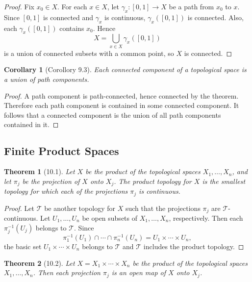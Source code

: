 \documentclass[12pt]{article}
\newtheorem{theorem}{Theorem}
\newtheorem{corollary}{Corollary}
\begin{document}
\begin{proof}
Fix $x_0 \in X$. For each $x \in X$, let $\gamma_x:[0,1]\to X$ be a path from $x_0$ to $x$. Since $[0,1]$ is connected and $\gamma_x$ is continuous, $\gamma_x([0,1])$ is connected. Also, each $\gamma_x([0,1])$ contains $x_0$. Hence
\[
X=\bigcup_{x\in X}\gamma_x([0,1])
\]
is a union of connected subsets with a common point, so $X$ is connected.
\end{proof}

\begin{corollary}[Corollory 9.3]
Each connected component of a topological space is a union of path components.
\end{corollary}

\begin{proof}
A path component is path-connected, hence connected by the theorem. Therefore each path component is contained in some connected component. It follows that a connected component is the union of all path components contained in it.
\end{proof}

\subsection*{Finite Product Spaces}

\begin{theorem}[10.1]
Let $X$ be the product of the topological spaces $X_1,\dots,X_n$, and let $\pi_j$ be the projection of $X$ onto $X_j$. The product topology for $X$ is the smallest topology for which each of the projections $\pi_j$ is continuous.
\end{theorem}

\begin{proof}
Let $\mathcal{T}$ be another topology for $X$ such that the projections $\pi_j$ are $\mathcal{T}$-continuous. Let $U_1,\dots,U_n$ be open subsets of $X_1,\dots,X_n$, respectively. Then each $\pi_j^{-1}(U_j)$ belongs to $\mathcal{T}$. Since
\[
\pi_1^{-1}(U_1)\cap\cdots\cap\pi_n^{-1}(U_n)=U_1\times\cdots\times U_n,
\]
the basic set $U_1\times\cdots\times U_n$ belongs to $\mathcal{T}$ and $\mathcal{T}$ includes the product topology.
\end{proof}

\begin{theorem}[10.2]
Let $X=X_1\times\cdots\times X_n$ be the product of the topological spaces $X_1,\dots,X_n$. Then each projection $\pi_j$ is an open map of $X$ onto $X_j$.
\end{theorem}
\end{document}
